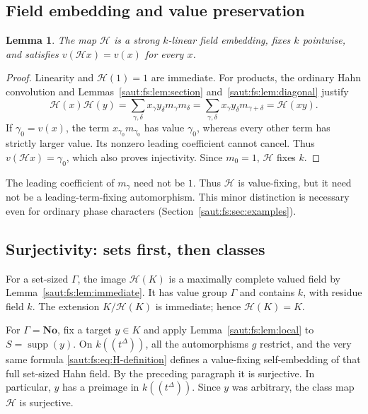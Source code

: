 \documentclass[11pt]{article}
\newtheorem{lemma}[theorem]{Lemma}
\theoremstyle{definition}
\theoremstyle{remark}
\newcommand{\No}{\mathbf{No}}
\newcommand{\supp}{\operatorname{supp}}
\numberwithin{equation}{section}
\begin{document}
\subsection{Field embedding and value preservation}

\begin{lemma}\label{saut:fs:lem:embedding}
The map $\mathcal H$ is a strong $k$-linear field embedding, fixes $k$ pointwise, and
satisfies $v(\mathcal Hx)=v(x)$ for every $x$.
\end{lemma}
\begin{proof}
Linearity and $\mathcal H(1)=1$ are immediate. For products, the ordinary Hahn
convolution and Lemmas~\ref{saut:fs:lem:section} and~\ref{saut:fs:lem:diagonal}
justify
\[
 \mathcal H(x)\mathcal H(y)
 =\sum_{\gamma,\delta}x_\gamma y_\delta m_\gamma m_\delta
 =\sum_{\gamma,\delta}x_\gamma y_\delta m_{\gamma+\delta}
 =\mathcal H(xy).
\]
If $\gamma_0=v(x)$, the term $x_{\gamma_0}m_{\gamma_0}$ has value $\gamma_0$, whereas
every other term has strictly larger value. Its nonzero leading coefficient cannot
cancel. Thus $v(\mathcal Hx)=\gamma_0$, which also proves injectivity. Since $m_0=1$,
$\mathcal H$ fixes $k$.
\end{proof}

The leading coefficient of $m_\gamma$ need not be $1$. Thus $\mathcal H$ is
value-fixing, but it need not be a leading-term-fixing automorphism. This minor
distinction is necessary even for ordinary phase characters
(Section~\ref{saut:fs:sec:examples}).

\subsection{Surjectivity: sets first, then classes}

For a set-sized $\Gamma$, the image $\mathcal H(K)$ is a maximally complete valued
field by Lemma~\ref{saut:fs:lem:immediate}. It has value group $\Gamma$ and contains
$k$, with residue field $k$. The extension $K/\mathcal H(K)$ is immediate; hence
$\mathcal H(K)=K$.

For $\Gamma=\No$, fix a target $y\in K$ and apply Lemma~\ref{saut:fs:lem:local} to
$S=\supp(y)$. On $k((t^\Delta))$, all the automorphisms $g$ restrict, and the very
same formula \eqref{saut:fs:eq:H-definition} defines a value-fixing self-embedding of
that full set-sized Hahn field. By the preceding paragraph it is surjective. In
particular, $y$ has a preimage in $k((t^\Delta))$. Since $y$ was arbitrary, the class
map $\mathcal H$ is surjective.
\end{document}
